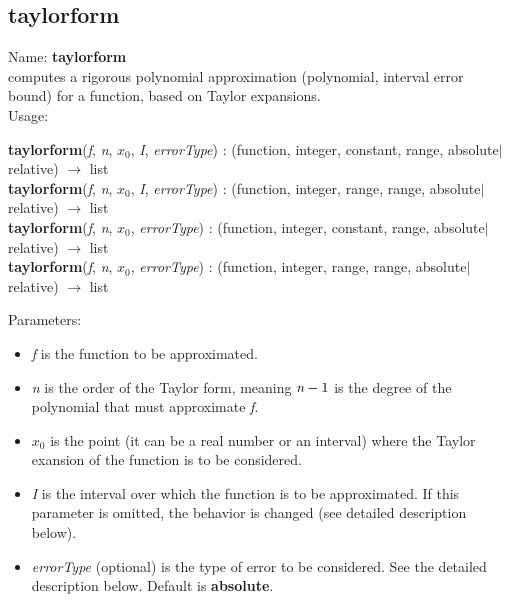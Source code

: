 \subsection{taylorform}
\label{labtaylorform}
\noindent Name: \textbf{taylorform}\\
computes a rigorous polynomial approximation (polynomial, interval error bound) for a function, based on Taylor expansions.\\
\noindent Usage: 
\begin{center}
\textbf{taylorform}(\emph{f}, \emph{n}, \emph{$x_0$}, \emph{I}, \emph{errorType}) : (\textsf{function}, \textsf{integer}, \textsf{constant}, \textsf{range}, \textsf{absolute$|$relative}) $\rightarrow$ \textsf{list}\\
\textbf{taylorform}(\emph{f}, \emph{n}, \emph{$x_0$}, \emph{I}, \emph{errorType}) : (\textsf{function}, \textsf{integer}, \textsf{range}, \textsf{range}, \textsf{absolute$|$relative}) $\rightarrow$ \textsf{list}\\
\textbf{taylorform}(\emph{f}, \emph{n}, \emph{$x_0$}, \emph{errorType}) : (\textsf{function}, \textsf{integer}, \textsf{constant}, \textsf{range}, \textsf{absolute$|$relative}) $\rightarrow$ \textsf{list}\\
\textbf{taylorform}(\emph{f}, \emph{n}, \emph{$x_0$}, \emph{errorType}) : (\textsf{function}, \textsf{integer}, \textsf{range}, \textsf{range}, \textsf{absolute$|$relative}) $\rightarrow$ \textsf{list}\\
\end{center}
Parameters: 
\begin{itemize}
\item \emph{f} is the function to be approximated.
\item \emph{n} is the order of the Taylor form, meaning $\emph{n}-1$ is the degree of the polynomial that must approximate \emph{f}.
\item \emph{$x_0$} is the point (it can be a real number or an interval) where the Taylor exansion of the function is to be considered.
\item \emph{I} is the interval over which the function is to be approximated. If this parameter is omitted, the behavior is changed (see detailed description below).
\item \emph{errorType} (optional) is the type of error to be considered. See the detailed description below. Default is \textbf{absolute}.
\end{itemize}
